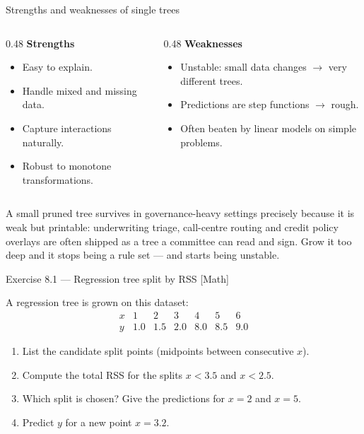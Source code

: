 \documentclass[aspectratio=169,11pt]{beamer}
\begin{document}
\begin{frame}{Strengths and weaknesses of single trees}
  \begin{columns}[T]
    \begin{column}{0.48\textwidth}
      \textbf{Strengths}
      \begin{itemize}
        \item Easy to explain.
        \item Handle mixed and missing data.
        \item Capture interactions naturally.
        \item Robust to monotone transformations.
      \end{itemize}
    \end{column}
    \begin{column}{0.48\textwidth}
      \textbf{Weaknesses}
      \begin{itemize}
        \item Unstable: small data changes $\to$ very different trees.
        \item Predictions are step functions $\to$ rough.
        \item Often beaten by linear models on simple problems.
      \end{itemize}
    \end{column}
  \end{columns}
  \begin{industry}
    A small pruned tree survives in governance-heavy settings precisely because it is weak but printable: underwriting triage, call-centre routing and credit policy overlays are often shipped as a tree a committee can read and sign. Grow it too deep and it stops being a rule set --- and starts being unstable.
  \end{industry}
\end{frame}

\begin{frame}{Exercise 8.1 --- Regression tree split by RSS [Math]}
\begin{exercise}
A regression tree is grown on this dataset:
\[
\begin{array}{c|cccccc}
x & 1 & 2 & 3 & 4 & 5 & 6\\\hline
y & 1.0 & 1.5 & 2.0 & 8.0 & 8.5 & 9.0
\end{array}
\]
\begin{enumerate}
  \item List the candidate split points (midpoints between consecutive $x$).
  \item Compute the total RSS for the splits $x<3.5$ and $x<2.5$.
  \item Which split is chosen? Give the predictions for $x=2$ and $x=5$.
  \item Predict $y$ for a new point $x=3.2$.
\end{enumerate}
\end{exercise}
\end{frame}
\end{document}
